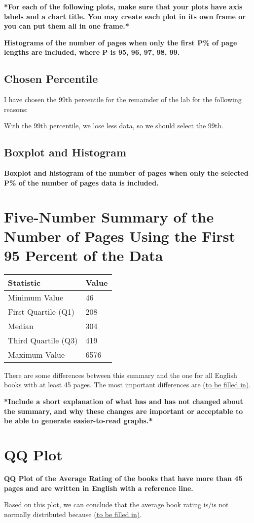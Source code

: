 \documentclass[12pt]{article}
\begin{document}
\textbf{*For each of the following plots, make sure that your plots have axis labels and a chart title. You may create each plot in its own frame or you can put them all in one frame.*}

\textbf{Histograms of the number of pages when only the first P\% of page lengths are included, where P is 95, 96, 97, 98, 99.}

\subsection*{Chosen Percentile}
I have chosen the 99th percentile for the remainder of the lab for the following reasons:

With the 99th percentile, we lose less data, so we should select the 99th.

\subsection*{Boxplot and Histogram}
\textbf{Boxplot and histogram of the number of pages when only the selected P\% of the number of pages data is included.}

\section*{Five-Number Summary of the Number of Pages Using the First 95 Percent of the Data}
\begin{tabular}{l l}
    \toprule
    \textbf{Statistic} & \textbf{Value} \\
    \midrule
    Minimum Value & 46 \\
    First Quartile (Q1) & 208 \\
    Median & 304 \\
    Third Quartile (Q3) & 419 \\
    Maximum Value & 6576 \\
    \bottomrule
\end{tabular}

There are some differences between this summary and the one for all English books with at least 45 pages. The most important differences are \underline{(to be filled in)}.

\textbf{*Include a short explanation of what has and has not changed about the summary, and why these changes are important or acceptable to be able to generate easier-to-read graphs.*}

\section*{QQ Plot}
\textbf{QQ Plot of the Average Rating of the books that have more than 45 pages and are written in English with a reference line.}

Based on this plot, we can conclude that the average book rating is/is not normally distributed because \underline{(to be filled in)}.
\end{document}

